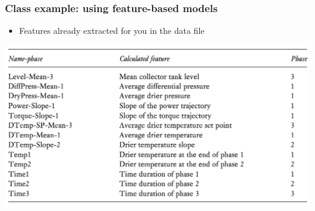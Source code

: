\begin{frame}\frametitle{Class example: using feature-based models}

	\begin{itemize}
	
		\item	Features already extracted for you in the data file
	
	\end{itemize}

	\begin{center}
		\includegraphics[width=\textwidth]{images/fmc/fmc-features-extracted.png}
	\end{center}

\end{frame}

